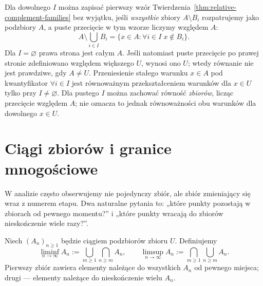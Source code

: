 \begin{uwaga}
\label{rem:empty-relative-intersection-xlii}
Dla dowolnego $I$ można zapisać pierwszy wzór
Twierdzenia~\ref{thm:relative-complement-families}
bez wyjątku, jeśli \emph{wszystkie} zbiory $A\setminus B_i$
rozpatrujemy jako podzbiory $A$, a puste przecięcie
w tym wzorze liczymy względem $A$:
\[
A\setminus\bigcup_{i\in I}B_i
=\{x\in A:\forall i\in I\;x\notin B_i\}.
\]
Dla $I=\varnothing$ prawa strona jest całym $A$.
Jeśli natomiast puste przecięcie po prawej stronie
zdefiniowano względem większego $U$, wynosi ono $U$;
wtedy równanie nie jest prawdziwe, gdy $A\ne U$.
Przeniesienie stałego warunku $x\in A$ pod kwantyfikator
$\forall i\in I$ jest równoważnym przekształceniem warunków
dla $x\in U$ tylko przy $I\ne\varnothing$.
Dla pustego $I$ można zachować równość \emph{zbiorów},
licząc przecięcie względem $A$; nie oznacza to jednak
równoważności obu warunków dla dowolnego $x\in U$.
\end{uwaga}


\section{Ciągi zbiorów i granice mnogościowe}\label{sec:set-limits}
W analizie często obserwujemy nie pojedynczy zbiór, ale zbiór
zmieniający się wraz z numerem etapu. Dwa naturalne pytania to:
„które punkty pozostają w zbiorach od pewnego momentu?” i
„które punkty wracają do zbiorów nieskończenie wiele razy?”.

\begin{definicja}\label{def:set-liminf-limsup}
Niech $(A_n)_{n\ge1}$ będzie ciągiem podzbiorów zbioru $U$.
Definiujemy
\[
\liminf_{n\to\infty}A_n
:=\bigcup_{m\ge1}\bigcap_{n\ge m}A_n,\qquad
\limsup_{n\to\infty}A_n
:=\bigcap_{m\ge1}\bigcup_{n\ge m}A_n.
\]
Pierwszy zbiór zawiera elementy należące do wszystkich $A_n$
od pewnego miejsca; drugi --- elementy należące do nieskończenie
wielu $A_n$.
\end{definicja}

